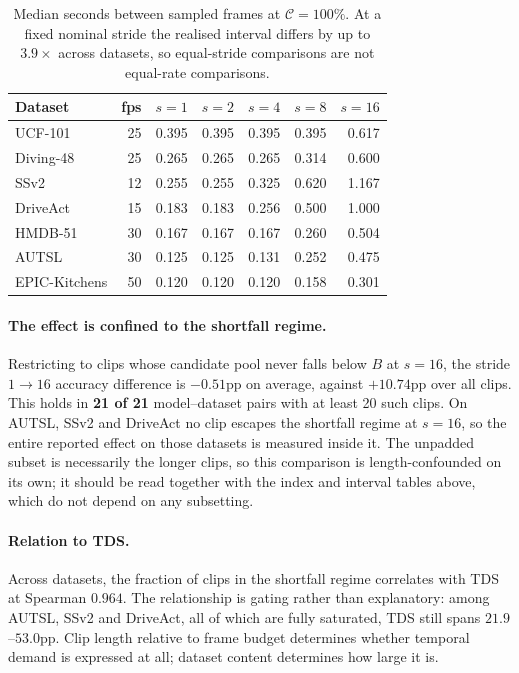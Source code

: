 \documentclass[runningheads]{llncs}
\newcommand{\tabtight}{\setlength{\tabcolsep}{3.5pt}\renewcommand{\arraystretch}{1.12}}
\newcommand{\TDS}{\textsc{TDS}}
\begin{document}
\begin{table}[!htbp]
\centering
\caption{Median seconds between sampled frames at $\mathcal{C}{=}100\%$. At a
fixed nominal stride the realised interval differs by up to $3.9\times$ across
datasets, so equal-stride comparisons are not equal-rate comparisons.}
\label{tab:sup_seconds}
\scriptsize\tabtight
\begin{tabular}{l r rrrrr}
\toprule
Dataset & fps & $s{=}1$ & $s{=}2$ & $s{=}4$ & $s{=}8$ & $s{=}16$ \\
\midrule
UCF-101       & 25 & 0.395 & 0.395 & 0.395 & 0.395 & 0.617 \\
Diving-48     & 25 & 0.265 & 0.265 & 0.265 & 0.314 & 0.600 \\
SSv2          & 12 & 0.255 & 0.255 & 0.325 & 0.620 & 1.167 \\
DriveAct      & 15 & 0.183 & 0.183 & 0.256 & 0.500 & 1.000 \\
HMDB-51       & 30 & 0.167 & 0.167 & 0.167 & 0.260 & 0.504 \\
AUTSL         & 30 & 0.125 & 0.125 & 0.131 & 0.252 & 0.475 \\
EPIC-Kitchens & 50 & 0.120 & 0.120 & 0.120 & 0.158 & 0.301 \\
\bottomrule
\end{tabular}
\end{table}

\paragraph{The effect is confined to the shortfall regime.} Restricting to clips
whose candidate pool never falls below $B$ at $s{=}16$, the stride $1\to16$
accuracy difference is $-0.51$pp on average, against $+10.74$pp over all clips.
This holds in \textbf{21 of 21} model--dataset pairs with at least 20 such clips.
On AUTSL, SSv2 and DriveAct no clip escapes the shortfall regime at $s{=}16$, so
the entire reported effect on those datasets is measured inside it. The unpadded
subset is necessarily the longer clips, so this comparison is length-confounded
on its own; it should be read together with the index and interval tables above,
which do not depend on any subsetting.

\paragraph{Relation to \TDS{}.} Across datasets, the fraction of clips in the
shortfall regime correlates with \TDS{} at Spearman $0.964$. The relationship is
gating rather than explanatory: among AUTSL, SSv2 and DriveAct, all of which are
fully saturated, \TDS{} still spans $21.9$--$53.0$pp. Clip length relative to
frame budget determines whether temporal demand is expressed at all; dataset
content determines how large it is.
\end{document}
